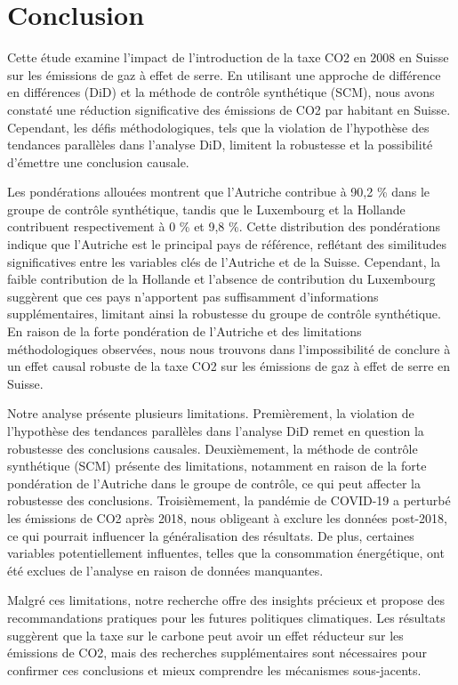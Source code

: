 \section{Conclusion}
\label{sec:conclusion}

Cette étude examine l'impact de l'introduction de la taxe CO2 en 2008 en Suisse sur les émissions de gaz à effet de serre. En utilisant une approche de différence en différences (DiD) et la méthode de contrôle synthétique (SCM), nous avons constaté une réduction significative des émissions de CO2 par habitant en Suisse. Cependant, les défis méthodologiques, tels que la violation de l'hypothèse des tendances parallèles dans l'analyse DiD, limitent la robustesse et la possibilité d'émettre une conclusion causale.

Les pondérations allouées montrent que l'Autriche contribue à 90,2 \% dans le groupe de contrôle synthétique, tandis que le Luxembourg et la Hollande contribuent respectivement à 0 \% et 9,8 \%. Cette distribution des pondérations indique que l'Autriche est le principal pays de référence, reflétant des similitudes significatives entre les variables clés de l'Autriche et de la Suisse. Cependant, la faible contribution de la Hollande et l'absence de contribution du Luxembourg suggèrent que ces pays n'apportent pas suffisamment d'informations supplémentaires, limitant ainsi la robustesse du groupe de contrôle synthétique. En raison de la forte pondération de l'Autriche et des limitations méthodologiques observées, nous nous trouvons dans l’impossibilité de conclure à un effet causal robuste de la taxe CO2 sur les émissions de gaz à effet de serre en Suisse.

Notre analyse présente plusieurs limitations. Premièrement, la violation de l'hypothèse des tendances parallèles dans l'analyse DiD remet en question la robustesse des conclusions causales. Deuxièmement, la méthode de contrôle synthétique (SCM) présente des limitations, notamment en raison de la forte pondération de l'Autriche dans le groupe de contrôle, ce qui peut affecter la robustesse des conclusions. Troisièmement, la pandémie de COVID-19 a perturbé les émissions de CO2 après 2018, nous obligeant à exclure les données post-2018, ce qui pourrait influencer la généralisation des résultats. De plus, certaines variables potentiellement influentes, telles que la consommation énergétique, ont été exclues de l'analyse en raison de données manquantes.



Malgré ces limitations, notre recherche offre des insights précieux et propose des recommandations pratiques pour les futures politiques climatiques. Les résultats suggèrent que la taxe sur le carbone peut avoir un effet réducteur sur les émissions de CO2, mais des recherches supplémentaires sont nécessaires pour confirmer ces conclusions et mieux comprendre les mécanismes sous-jacents.

